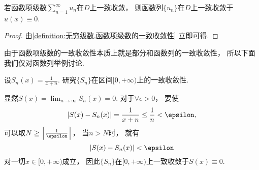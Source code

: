 \begin{proposition}
若函数项级数\(\sum_{n=1}^\infty u_n\)在\(D\)上一致收敛，
则函数列\(\{u_n\}\)在\(D\)上一致收敛于\(u(x) \equiv 0\).
\begin{proof}
由\cref{definition:无穷级数.函数项级数的一致收敛性} 立即可得.
\end{proof}
\end{proposition}

由于函数项级数的一致收敛性本质上就是部分和函数列的一致收敛性，
所以下面我们仅对函数列举例讨论.

\begin{example}
设\(S_n(x) = \frac1{x+n}\).
研究\(\{S_n\}\)在区间\([0,+\infty)\)上的一致收敛性.
\begin{solution}
显然\(S(x) = \lim_{n\to\infty} S_n(x) = 0\).
对于\(\forall\epsilon>0\)，
要使\[
	\abs{S(x) - S_n(x)}
	= \frac1{x+n}
	\leq \frac1{n}
	< \epsilon,
\]
可以取\(N \geq \ceil*{\frac1{\epsilon}}\)，
当\(n>N\)时，
就有\[
	\abs{S(x) - S_n(x)}
	< \epsilon
\]对一切\(x\in[0,+\infty)\)成立，
因此\(\{S_n\}\)在\([0,+\infty)\)上一致收敛于\(S(x)\equiv0\).
\end{solution}
\end{example}

